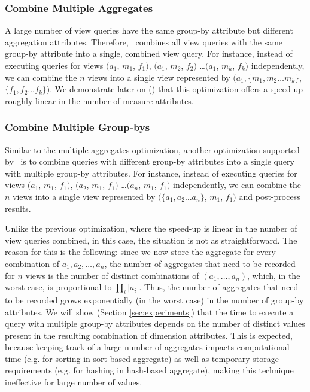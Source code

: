 \subsubsection {Combine Multiple Aggregates} 
A large number of view queries have the same group-by attribute but different
aggregation attributes. 
Therefore, \VizRecDB\ combines all view queries with the same
group-by attribute into a single, combined view query. For instance, instead of executing
queries for views $(a_1$, $m_1$, $f_1)$, $(a_1$, $m_2$, $f_2)$ \ldots $(a_1$, $m_k$, $f_k)$
independently, we can combine the $n$ views into a single view represented by
$(a_1, \{m_1, m_2\ldots m_k\}$, $\{f_1, f_2\ldots f_k\})$. We demonstrate later on 
()
that this optimization offers a speed-up roughly linear in the number of measure
attributes.

\subsubsection {Combine Multiple Group-bys}
\label{subsec:mult_gb}
  Similar to the multiple aggregates optimization, another optimization
  supported by \VizRecDB\ is to combine queries with different group-by attributes
  into a single query with multiple group-by attributes.
  For instance, instead of executing queries for views $(a_1$, $m_1$, $f_1)$,
  $(a_2$, $m_1$, $f_1)$ \ldots $(a_n$, $m_1$, $f_1)$ independently, we can
  combine the $n$ views into a single view represented by $(\{a_1, a_2\ldots
  a_n\}$, $m_1$, $f_1)$ and post-process results.

Unlike the previous optimization, where the speed-up is linear in the number of 
view queries combined, in this case, the situation is not as straightforward. 
The reason for this is the following:
since we now store the aggregate for every combination
of $a_1, a_2, \ldots, a_n$, 
the number of aggregates that need to be recorded for 
$n$ views is the number of distinct combinations
of $(a_1, \ldots, a_n)$, which, in the worst case, 
is proportional to $\prod_i |a_i|$.
Thus, the number of aggregates that need to be recorded 
grows exponentially (in the worst case) in the
number of group-by attributes. 
We will show (Section \ref{sec:experiments}) that 
the time to execute a query with multiple group-by attributes
depends on the number of distinct values present in the resulting 
combination of dimension attributes. 
This is expected, because keeping track of a large number
of aggregates impacts computational time (e.g. for sorting in sort-based aggregate)
as well as temporary storage requirements (e.g. for hashing in hash-based
aggregate), making this technique ineffective for large number of values.

